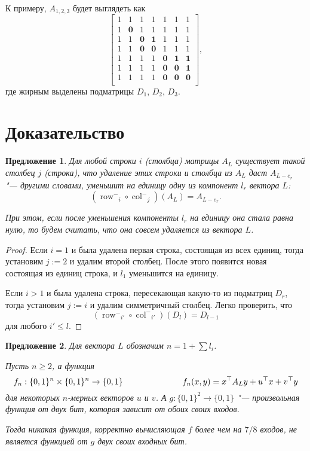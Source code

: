 \documentclass[oneside, a4paper]{article}
\newtheorem{proposition}{Предложение}
\theoremstyle{definition}
\theoremstyle{remark}
\newcommand\rowm{\ensuremath{\operatorname{row}^-}}
\newcommand\colm{\ensuremath{\operatorname{col}^-}}
\begin{document}
К примеру, $A_{1, 2, 3}$ будет выглядеть как
\[
\begin{bmatrix}
1 & 1 & 1 & 1 & 1 & 1 & 1 \\
1 & \mathbf{0} & 1 & 1 & 1 & 1 & 1 \\
1 & 1 & \mathbf{0} & \mathbf{1} & 1 & 1 & 1 \\
1 & 1 & \mathbf{0} & \mathbf{0} & 1 & 1 & 1 \\
1 & 1 & 1 & 1 & \mathbf{0} & \mathbf{1} & \mathbf{1} \\
1 & 1 & 1 & 1 & \mathbf{0} & \mathbf{0} & \mathbf{1} \\
1 & 1 & 1 & 1 & \mathbf{0} & \mathbf{0} & \mathbf{0} \\
\end{bmatrix},
\]
где жирным выделены подматрицы $D_1$, $D_2$, $D_3$.

\section{Доказательство}

\begin{proposition} \label{easy}
Для любой строки $i$ (столбца) матрицы $A_L$ существует такой столбец $j$
(строка), что удаление этих строки и столбца из $A_L$ даст $A_{L - e_r}$ "---
другими словами, уменьшит на единицу одну из компонент $l_r$ вектора $L$:
\[
(\rowm_i \circ \colm_j)(A_L) = A_{L - e_r}.
\]

При этом, если после уменьшения компоненты $l_r$ на единицу она стала равна нулю,
то будем считать, что она совсем удаляется из вектора $L$.
\end{proposition}
\begin{proof}
Если $i = 1$ и была удалена первая строка, состоящая из всех единиц, тогда
установим $j := 2$ и удалим второй столбец. После этого появится новая состоящая
из единиц строка, и $l_1$ уменьшится на единицу.

Если $i > 1$ и была удалена строка, пересекающая какую-то из подматриц $D_r$,
тогда установим $j := i$ и удалим симметричный столбец. Легко проверить, что
\[
(\rowm_{i'} \circ \colm_{i'})(D_l) = D_{l-1}
\]
для любого $i' \leq l$.
\end{proof}

\begin{proposition} \label{tough}
Для вектора $L$ обозначим $n = 1 + \sum l_i$.

Пусть $n \geq 2$, а функция
\[
f_n : \{0, 1\}^n \times \{0, 1\}^n \to \{0, 1\} \hspace{2.5cm}
f_n(x, y) = x^\top A_L y + u^\top x + v^\top y
\]
для некоторых $n$-мерных векторов $u$ и $v$. А $g : \{0, 1\}^2 \to \{0, 1\}$
"--- произвольная функция от двух бит, которая зависит от обоих своих входов.

Тогда никакая функция, корректно вычисляющая $f$ более чем на $7/8$ входов, не
является функцией от $g$ двух своих входных бит.
\end{proposition}
\end{document}
